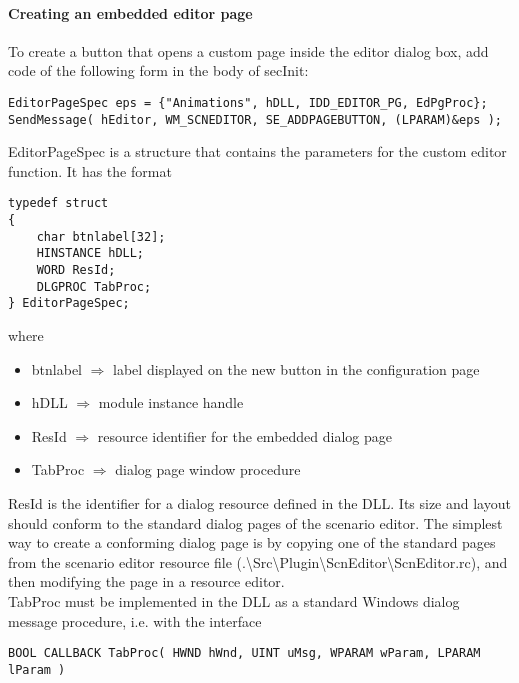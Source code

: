 \documentclass[Orbiter Developer Manual.tex]{subfiles}
\begin{document}
\paragraph{Creating an embedded editor page}
To create a button that opens a custom page inside the editor dialog box, add code of the following form in the body of secInit:

\begin{lstlisting}
EditorPageSpec eps = {"Animations", hDLL, IDD_EDITOR_PG, EdPgProc};
SendMessage( hEditor, WM_SCNEDITOR, SE_ADDPAGEBUTTON, (LPARAM)&eps );
\end{lstlisting}

\noindent
EditorPageSpec is a structure that contains the parameters for the custom editor function. It has the format

\begin{lstlisting}
typedef struct
{
	char btnlabel[32];
	HINSTANCE hDLL;
	WORD ResId;
	DLGPROC TabProc;
} EditorPageSpec;
\end{lstlisting}

\noindent
where

\begin{itemize}
\item btnlabel $\Rightarrow$ label displayed on the new button in the configuration page
\item hDLL $\Rightarrow$ module instance handle
\item ResId $\Rightarrow$ resource identifier for the embedded dialog page
\item TabProc $\Rightarrow$ dialog page window procedure
\end{itemize}

\noindent
ResId is the identifier for a dialog resource defined in the DLL. Its size and layout should conform to the standard dialog pages of the scenario editor. The simplest way to create a conforming dialog page is by copying one of the standard pages from the scenario editor resource file (.\textbackslash Src\textbackslash Plugin\textbackslash ScnEditor\textbackslash ScnEditor.rc), and then modifying the page in a resource editor.\\
TabProc must be implemented in the DLL as a standard Windows dialog message procedure, i.e. with the interface

\begin{lstlisting}
BOOL CALLBACK TabProc( HWND hWnd, UINT uMsg, WPARAM wParam, LPARAM lParam )
\end{lstlisting}
\end{document}

